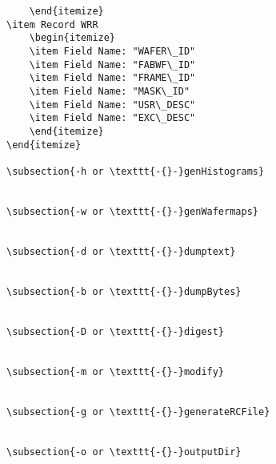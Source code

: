\documentclass[letterpaper]{article}
\begin{document}
\begin{verbatim}
    \end{itemize}
\item Record WRR
    \begin{itemize}
    \item Field Name: "WAFER\_ID"
    \item Field Name: "FABWF\_ID"
    \item Field Name: "FRAME\_ID"
    \item Field Name: "MASK\_ID"
    \item Field Name: "USR\_DESC"
    \item Field Name: "EXC\_DESC"
    \end{itemize}
\end{itemize}

\subsection{-h or \texttt{-{}-}genHistograms}


\subsection{-w or \texttt{-{}-}genWafermaps}


\subsection{-d or \texttt{-{}-}dumptext}


\subsection{-b or \texttt{-{}-}dumpBytes}


\subsection{-D or \texttt{-{}-}digest}


\subsection{-m or \texttt{-{}-}modify}


\subsection{-g or \texttt{-{}-}generateRCFile}


\subsection{-o or \texttt{-{}-}outputDir}










\end{verbatim}
\end{document}
